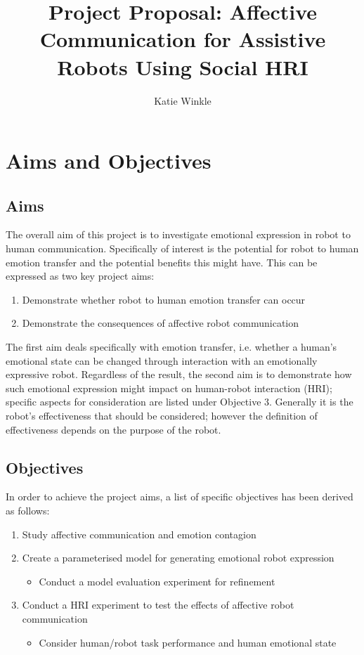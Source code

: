\documentclass[11pt]{article}
\title{Project Proposal: Affective Communication for Assistive Robots Using Social HRI}
\author{Katie Winkle}
\begin{document}
\maketitle

\begin{abstract}

\end{abstract}

\section{Aims and Objectives}
\subsection{Aims}
The overall aim of this project is to investigate emotional expression in robot to human communication. Specifically of interest is the potential for robot to human emotion transfer and the potential benefits this might have. This can be expressed as two key project aims:

\begin{enumerate}
\item Demonstrate whether robot to human emotion transfer can occur
\item Demonstrate the consequences of affective robot communication
\end{enumerate}

The first aim deals specifically with emotion transfer, i.e. whether a human's emotional state can be changed through interaction with an emotionally expressive robot. Regardless of the result, the second aim is to demonstrate how such emotional expression might impact on human-robot interaction (HRI); specific aspects for consideration are listed under Objective 3. Generally it is the robot's effectiveness that should be considered; however the definition of effectiveness depends on the purpose of the robot. 

\subsection{Objectives}
In order to achieve the project aims, a list of specific objectives has been derived as follows: 
\begin{enumerate}
\item Study affective communication and emotion contagion
\item Create a parameterised model for generating emotional robot expression
\begin{itemize}
\item Conduct a model evaluation experiment for refinement
\end{itemize}
\item Conduct a HRI experiment to test the effects of affective robot communication
\begin{itemize}
\item Consider human/robot task performance and human emotional state
\end{itemize}
\end{enumerate}
\end{document}
